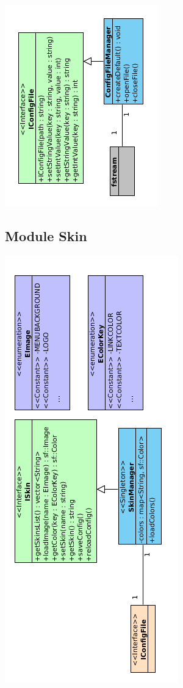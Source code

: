\begin{center}
\includegraphics[scale=1]{images/UML/configFile.png}
\end{center}

\subsection{Module Skin}

\begin{center}
\includegraphics[scale=1]{images/UML/skin.png}
\end{center}

